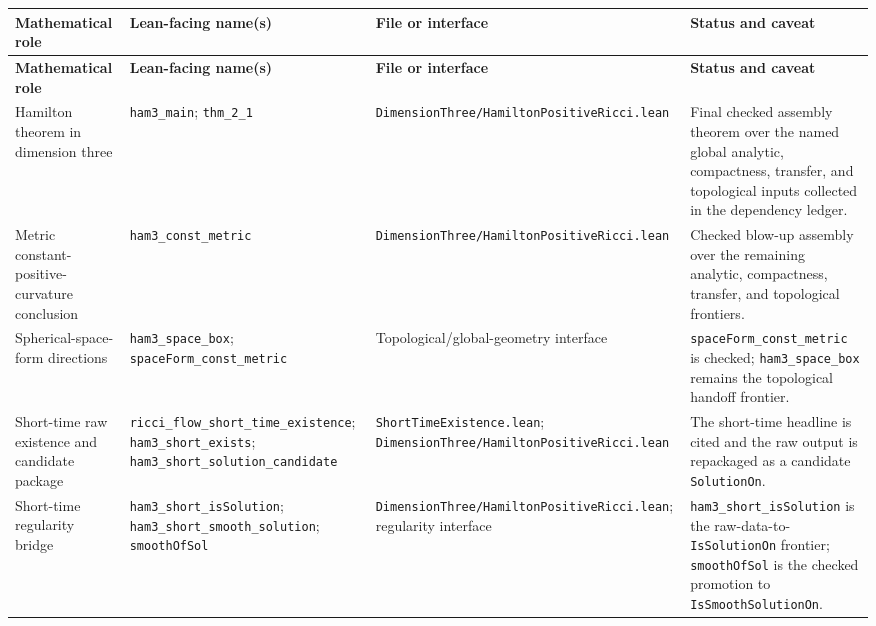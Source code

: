 \documentclass[11pt]{article}
\theoremstyle{plain}
\theoremstyle{definition}
\theoremstyle{remark}
\newcommand{\leanref}[1]{\nolinkurl{#1}}
\newcommand{\leanfile}[1]{\nolinkurl{#1}}
\newcommand{\rffile}[1]{\leanfile{#1}}
\begin{document}
{\footnotesize
\setlength{\LTpre}{0.5em}
\setlength{\LTpost}{0.5em}
\renewcommand{\arraystretch}{1.12}
\begin{longtable}{@{}>{\raggedright\arraybackslash}p{}@{\hspace{0.35em}}>{\raggedright\arraybackslash}p{}@{\hspace{0.35em}}>{\raggedright\arraybackslash}p{}@{\hspace{0.35em}}>{\raggedright\arraybackslash}p{}@{}}
\textbf{Mathematical role} & \textbf{Lean-facing name(s)} & \textbf{File or interface} & \textbf{Status and caveat} \\
\hline
\endfirsthead
\textbf{Mathematical role} & \textbf{Lean-facing name(s)} & \textbf{File or interface} & \textbf{Status and caveat} \\
\hline
\endhead

Hamilton theorem in dimension three &
\leanref{ham3_main}; \leanref{thm_2_1} &
\rffile{DimensionThree/HamiltonPositiveRicci.lean} &
Final checked assembly theorem over the named global analytic, compactness, transfer, and topological inputs collected in the dependency ledger. \\

Metric constant-positive-curvature conclusion &
\leanref{ham3_const_metric} &
\rffile{DimensionThree/HamiltonPositiveRicci.lean} &
Checked blow-up assembly over the remaining analytic, compactness, transfer, and topological frontiers. \\

Spherical-space-form directions &
\leanref{ham3_space_box}; \leanref{spaceForm_const_metric} &
Topological/global-geometry interface &
\leanref{spaceForm_const_metric} is checked; \leanref{ham3_space_box} remains
the topological handoff frontier. \\

Short-time raw existence and candidate package &
\leanref{ricci_flow_short_time_existence}; \leanref{ham3_short_exists}; \leanref{ham3_short_solution_candidate} &
\rffile{ShortTimeExistence.lean}; \rffile{DimensionThree/HamiltonPositiveRicci.lean} &
The short-time headline is cited and the raw output is repackaged as a candidate \leanref{SolutionOn}. \\

Short-time regularity bridge &
\leanref{ham3_short_isSolution}; \leanref{ham3_short_smooth_solution}; \leanref{smoothOfSol} &
\rffile{DimensionThree/HamiltonPositiveRicci.lean}; regularity interface &
\leanref{ham3_short_isSolution} is the raw-data-to-\leanref{IsSolutionOn} frontier; \leanref{smoothOfSol} is the checked promotion to \leanref{IsSmoothSolutionOn}. \\


\end{longtable}}
\end{document}
